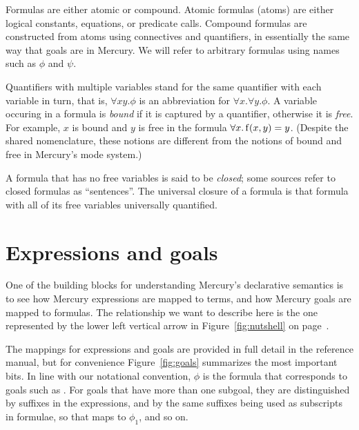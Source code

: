 Formulas are either atomic or compound.
Atomic formulas (atoms\label{gi:atom2}) are either
logical constants, equations, or predicate calls.
Compound formulas are constructed from atoms
using connectives and quantifiers,
in essentially the same way that goals are in Mercury.
We will refer to arbitrary formulas
using names such as $\phi$ and $\psi$.

Quantifiers with multiple variables stand for
the same quantifier with each variable in turn,
that is, $\forall x y.\phi$
is an abbreviation for $\forall x.\forall y.\phi$.
A variable occuring in a formula is \emph{bound\label{gi:bound}}
if it is captured by a quantifier,
otherwise it is \emph{free\label{gi:free}}.
For example,
$x$ is bound and $y$ is free
in the formula $\forall x. \operatorname{f}(x, y) = y$.
(Despite the shared nomenclature,
these notions are different from the notions of bound and free
in Mercury's mode system.)

A formula that has no free variables
is said to be \emph{closed\label{gi:closed-formula}};
some sources refer to closed formulas as ``sentences''.
The universal closure of a formula is that formula with
all of its free variables universally quantified.


\section{Expressions and goals}
\label{sec:goals}

One of the building blocks
for understanding Mercury's declarative semantics
is to see how Mercury expressions are mapped to terms,
and how Mercury goals are mapped to formulas.
The relationship we want to describe here is
the one represented by the lower left vertical arrow
in Figure~\ref{fig:nutshell} on page~\pageref{fig:nutshell}.

The mappings for expressions and goals
are provided in full detail in the reference manual,
but for convenience
Figure~\ref{fig:goals} summarizes the most important bits.
In line with our notational convention,
$\phi$ is the formula that corresponds to goals such as .
For goals that have more than one subgoal,
they are distinguished by suffixes in the expressions,
and by the same suffixes being used as subscripts in formulae,
so that  maps to $\phi_1$, and so on.

